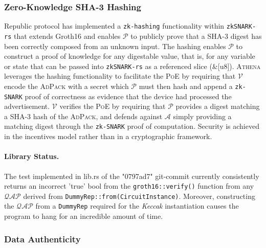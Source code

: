 \documentclass{article}
\begin{document}
			\subsubsection{Zero-Knowledge SHA-3 Hashing}
			
				Republic protocol has implemented a \texttt{zk-hashing} functionality within \texttt{zkSNARK-rs} that extends Groth16 and enables $\mathcal{P}$ to publicly prove that a SHA-3 digest has been correctly composed from an unknown input. The hashing enables $\mathcal{P}$ to construct a proof of knowledge for any digestable value, that is, for any variable or state that can be passed into \texttt{zkSNARK-rs} as a referenced slice (\&[u8]). \textsc{Athena} leverages the hashing functionality to facilitate the \textsc{PoE} by requiring that $\mathcal{V}$ encode the \textsc{AdPack} with a secret which $\mathcal{P}$ must then hash and append a \texttt{zk-SNARK} proof of correctness as evidence that the device had processed the advertisement. $\mathcal{V}$ verifies the \textsc{PoE} by requiring that $\mathcal{P}$ provides a digest matching a SHA-3 hash of the \textsc{AdPack}, and defends against $\mathcal{A}$ simply providing a matching digest through the \texttt{zk-SNARK} proof of computation. Security is achieved in the incentives model rather than in a cryptographic framework.
						
				\paragraph{Library Status.} The test implemented in lib.rs of the "0797ad7" git-commit currently consistently returns an incorrect 'true' bool from the \texttt{groth16::verify()} function from any $\mathcal{QAP}$ derived from \texttt{DummyRep::from(CircuitInstance)}. Moreover, constructing the $\mathcal{QAP}$ from a \texttt{DummyRep} required for the \textit{Keccak} instantiation causes the program to hang for an incredible amount of time.
			
			\subsubsection{Data Authenticity}
					

				
		
\end{document}
